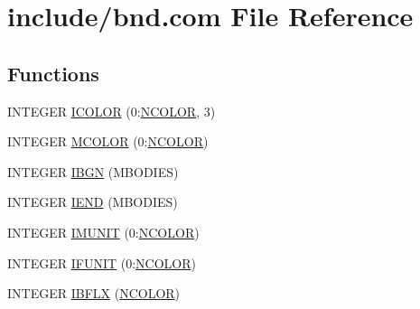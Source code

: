 \hypertarget{bnd_8com}{\section{include/bnd.com File Reference}
\label{bnd_8com}
}
\subsection*{Functions}
\begin{DoxyCompactItemize}
\item 
I\-N\-T\-E\-G\-E\-R \hyperlink{bnd_8com_a80aa0313e1ef320813f587804c852992}{I\-C\-O\-L\-O\-R} (0\-:\hyperlink{bnd_8h_a9fc66e47390039de9cc3084bf6825fe1}{N\-C\-O\-L\-O\-R}, 3)
\item 
I\-N\-T\-E\-G\-E\-R \hyperlink{bnd_8com_a08b7d66e5deecd1c9a09cc14d9d107a8}{M\-C\-O\-L\-O\-R} (0\-:\hyperlink{bnd_8h_a9fc66e47390039de9cc3084bf6825fe1}{N\-C\-O\-L\-O\-R})
\item 
I\-N\-T\-E\-G\-E\-R \hyperlink{bnd_8com_a4842eb20d87380d011dd06416621e6aa}{I\-B\-G\-N} (M\-B\-O\-D\-I\-E\-S)
\item 
I\-N\-T\-E\-G\-E\-R \hyperlink{bnd_8com_a1576f9b4b3ad9dc05bb01f76c628df7d}{I\-E\-N\-D} (M\-B\-O\-D\-I\-E\-S)
\item 
I\-N\-T\-E\-G\-E\-R \hyperlink{bnd_8com_a2057fcc57502be0c35ec28e1e55dd60d}{I\-M\-U\-N\-I\-T} (0\-:\hyperlink{bnd_8h_a9fc66e47390039de9cc3084bf6825fe1}{N\-C\-O\-L\-O\-R})
\item 
I\-N\-T\-E\-G\-E\-R \hyperlink{bnd_8com_a39e875fb16285a881e304a8e836d5bf8}{I\-F\-U\-N\-I\-T} (0\-:\hyperlink{bnd_8h_a9fc66e47390039de9cc3084bf6825fe1}{N\-C\-O\-L\-O\-R})
\item 
I\-N\-T\-E\-G\-E\-R \hyperlink{bnd_8com_addddb18e9abe37720d5601329ff81f6a}{I\-B\-F\-L\-X} (\hyperlink{bnd_8h_a9fc66e47390039de9cc3084bf6825fe1}{N\-C\-O\-L\-O\-R})
\end{DoxyCompactItemize}


